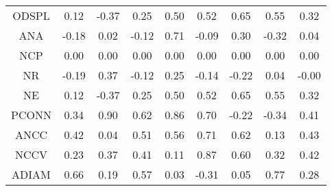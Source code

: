 \begin{longtable}{ | c || c | c | c | c | c | c | c || c |}
ODSPL &  \cellcolor[HTML]{FFFFFF} 0.12 &  \cellcolor[HTML]{FFF7F7} -0.37 &  \cellcolor[HTML]{F7F7FF} 0.25 &  \cellcolor[HTML]{EFEFFF} 0.50 &  \cellcolor[HTML]{EFEFFF} 0.52 &  \cellcolor[HTML]{EFEFFF} 0.65 &  \cellcolor[HTML]{EFEFFF} 0.55 &  \cellcolor[HTML]{F7F7FF} 0.32 \\
ANA &  \cellcolor[HTML]{FFF7F7} -0.18 &  \cellcolor[HTML]{FFFFFF} 0.02 &  \cellcolor[HTML]{FFFFFF} -0.12 &  \cellcolor[HTML]{EFEFFF} 0.71 &  \cellcolor[HTML]{FFFFFF} -0.09 &  \cellcolor[HTML]{F7F7FF} 0.30 &  \cellcolor[HTML]{FFF7F7} -0.32 &  \cellcolor[HTML]{FFFFFF} 0.04 \\
NCP &  \cellcolor[HTML]{FFFFFF} 0.00 &  \cellcolor[HTML]{FFFFFF} 0.00 &  \cellcolor[HTML]{FFFFFF} 0.00 &  \cellcolor[HTML]{FFFFFF} 0.00 &  \cellcolor[HTML]{FFFFFF} 0.00 &  \cellcolor[HTML]{FFFFFF} 0.00 &  \cellcolor[HTML]{FFFFFF} 0.00 &  \cellcolor[HTML]{FFFFFF} 0.00 \\
NR &  \cellcolor[HTML]{FFF7F7} -0.19 &  \cellcolor[HTML]{F7F7FF} 0.37 &  \cellcolor[HTML]{FFFFFF} -0.12 &  \cellcolor[HTML]{F7F7FF} 0.25 &  \cellcolor[HTML]{FFFFFF} -0.14 &  \cellcolor[HTML]{FFF7F7} -0.22 &  \cellcolor[HTML]{FFFFFF} 0.04 &  \cellcolor[HTML]{FFFFFF} -0.00 \\
NE &  \cellcolor[HTML]{FFFFFF} 0.12 &  \cellcolor[HTML]{FFF7F7} -0.37 &  \cellcolor[HTML]{F7F7FF} 0.25 &  \cellcolor[HTML]{EFEFFF} 0.50 &  \cellcolor[HTML]{EFEFFF} 0.52 &  \cellcolor[HTML]{EFEFFF} 0.65 &  \cellcolor[HTML]{EFEFFF} 0.55 &  \cellcolor[HTML]{F7F7FF} 0.32 \\
PCONN &  \cellcolor[HTML]{F7F7FF} 0.34 &  \cellcolor[HTML]{E7E7FF} 0.90 &  \cellcolor[HTML]{EFEFFF} 0.62 &  \cellcolor[HTML]{E7E7FF} 0.86 &  \cellcolor[HTML]{EFEFFF} 0.70 &  \cellcolor[HTML]{FFF7F7} -0.22 &  \cellcolor[HTML]{FFF7F7} -0.34 &  \cellcolor[HTML]{F7F7FF} 0.41 \\
ANCC &  \cellcolor[HTML]{F7F7FF} 0.42 &  \cellcolor[HTML]{FFFFFF} 0.04 &  \cellcolor[HTML]{EFEFFF} 0.51 &  \cellcolor[HTML]{EFEFFF} 0.56 &  \cellcolor[HTML]{EFEFFF} 0.71 &  \cellcolor[HTML]{EFEFFF} 0.62 &  \cellcolor[HTML]{FFFFFF} 0.13 &  \cellcolor[HTML]{F7F7FF} 0.43 \\
NCCV &  \cellcolor[HTML]{F7F7FF} 0.23 &  \cellcolor[HTML]{F7F7FF} 0.37 &  \cellcolor[HTML]{F7F7FF} 0.41 &  \cellcolor[HTML]{FFFFFF} 0.11 &  \cellcolor[HTML]{E7E7FF} 0.87 &  \cellcolor[HTML]{EFEFFF} 0.60 &  \cellcolor[HTML]{F7F7FF} 0.32 &  \cellcolor[HTML]{F7F7FF} 0.42 \\
ADIAM &  \cellcolor[HTML]{EFEFFF} 0.66 &  \cellcolor[HTML]{F7F7FF} 0.19 &  \cellcolor[HTML]{EFEFFF} 0.57 &  \cellcolor[HTML]{FFFFFF} 0.03 &  \cellcolor[HTML]{FFF7F7} -0.31 &  \cellcolor[HTML]{FFFFFF} 0.05 &  \cellcolor[HTML]{EFEFFF} 0.77 &  \cellcolor[HTML]{F7F7FF} 0.28 \\

\end{longtable}
